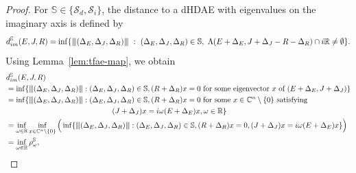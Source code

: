 \documentclass[11pt]{article}
\newcommand{\R}{\mathbb R}
\newcommand{\C}{\mathbb C}
\newcommand{\nnrm}[1]{{\left\vert\kern-0.25ex\left\vert\kern-0.25ex\left\vert #1
		\right\vert\kern-0.25ex\right\vert\kern-0.25ex\right\vert}}
\begin{document}
\begin{proof}
    For $\mathbb S\in \{\mathcal S_d,\mathcal S_i\}$,  the distance to a dHDAE with eigenvalues on the imaginary axis is defined by
    \begin{equation*}
        d_{im}^{\mathbb S}(E,J,R) = \inf\{\nnrm{(\Delta_E,\Delta_J,\Delta_R)}~:~(\Delta_E,\Delta_J,\Delta_R)\in \mathbb S,~\Lambda(E+\Delta_E,J+\Delta_J-R-\Delta_R)\cap i\mathbb R \neq \emptyset \}.
    \end{equation*}
    Using Lemma~\ref{lem:tfae-map}, we obtain
    \begin{align*}
        &d_{im}^{\mathbb S}(E,J,R)\nonumber\\
        &= \inf\{\nnrm{(\Delta_E,\Delta_J,\Delta_R)}:(\Delta_E,\Delta_J,\Delta_R)\in \mathbb S, (R+\Delta_R)x=0 \text{ for some eigenvector $x$ of } (E+\Delta_E,J+\Delta_J) \}\nonumber\\
		&=\inf\{ \nnrm{(\Delta_E,\Delta_J,\Delta_R)}:(\Delta_E,\Delta_J,\Delta_R)\in \mathbb S, (R+\Delta_R)x=0 \text{ for some $x\in \C^n\setminus\{0\}$ satisfying } \nonumber\\ &\hspace{5cm}  (J+\Delta_J)x= i\omega (E+\Delta_E) x, \omega\in \R\}\nonumber\\
		&= \inf_{\omega\in \R}\inf_{x\in\C^{n}\setminus \{0\}} \Big(\inf \{ \nnrm{(\Delta_E,\Delta_J,\Delta_R)}:(\Delta_E,\Delta_J,\Delta_R)\in \mathbb S, (R+\Delta_R)x=0, (J+\Delta_J)x= i\omega (E+\Delta_E) x\} \Big)\nonumber\\
		&=\inf_{\omega \in \R } \rho_\omega^{\mathbb S},
    \end{align*}

\end{proof}
\end{document}
